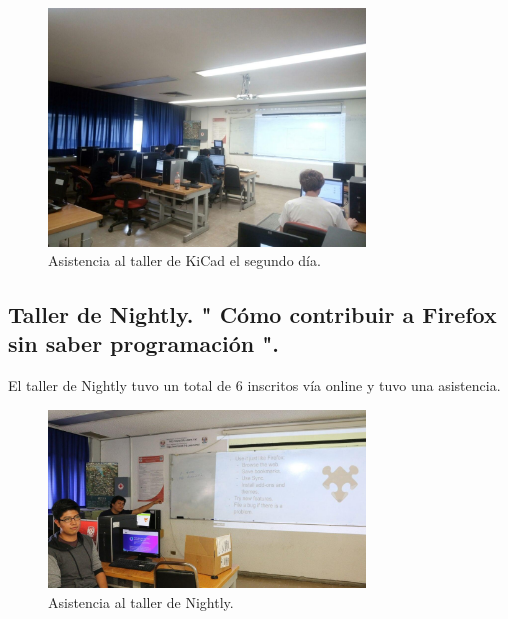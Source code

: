 \documentclass[a4paper,11pt]{article}                 %
\begin{document}
  \begin{figure}[H]
    \begin{center}
      \includegraphics[width=0.75\textwidth]{images/kicad-02}
      \caption{Asistencia al taller de KiCad el segundo día.}
      \label{fig:kicad-02}
    \end{center}
  \end{figure}   
  
  \subsection{Taller de Nightly. " {Cómo} contribuir a Firefox sin saber programación ".}  
  
El taller de  Nightly tuvo un total de 6 inscritos vía online y tuvo una asistencia.

       \begin{figure}[H]
    \begin{center}
      \includegraphics[width=0.75\textwidth]{images/nightly-01}
      \caption{Asistencia al taller de Nightly.}
      \label{fig:nightly-01}
    \end{center}
  \end{figure} 
  
\end{document}
